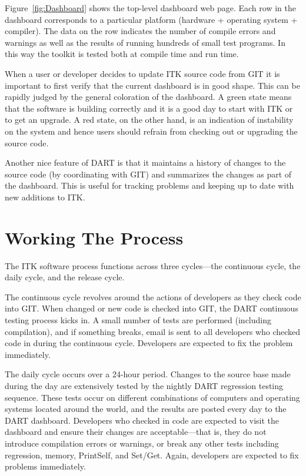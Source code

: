 Figure~\ref{fig:Dashboard} shows the top-level dashboard web page. Each row
in the dashboard corresponds to a particular platform (hardware + operating
system + compiler). The data on the row indicates the number of compile
errors and warnings as well as the results of running hundreds of
small test programs. In this way the toolkit is tested both at compile time
and run time.

When a user or developer decides to update ITK source code from GIT it is
important to first verify that the current dashboard is in good shape. This
can be rapidly judged by the general coloration of the dashboard. A green
state means that the software is building correctly and it is a good day to
start with ITK or to get an upgrade. A red state, on the other hand, is an
indication of instability on the system and hence users should refrain from
checking out or upgrading the source code.

Another nice feature of DART is that it maintains a history of changes to the
source code (by coordinating with GIT) and summarizes the changes as part of
the dashboard. This is useful for tracking problems and keeping up to date
with new additions to ITK.

\section{Working The Process}
\label{sec:WorkingTheProcess}

The ITK software process functions across three cycles---the continuous
cycle, the daily cycle, and the release cycle.

The continuous cycle revolves around the actions of developers as they check
code into GIT. When changed or new code is checked into GIT, the DART
continuous testing process kicks in. A small number of tests are performed
(including compilation), and if something breaks, email is sent to all
developers who checked code in during the continuous cycle. Developers are
expected to fix the problem immediately.

The daily cycle occurs over a 24-hour period. Changes to the source base made
during the day are extensively tested by the nightly DART regression testing
sequence. These tests occur on different combinations of computers and
operating systems located around the world, and the results are posted every
day to the DART dashboard. Developers who checked in code are expected to
visit the dashboard and ensure their changes are acceptable---that is, they
do not introduce compilation errors or warnings, or break any other tests
including regression, memory, PrintSelf, and Set/Get. Again, developers are
expected to fix problems immediately.

